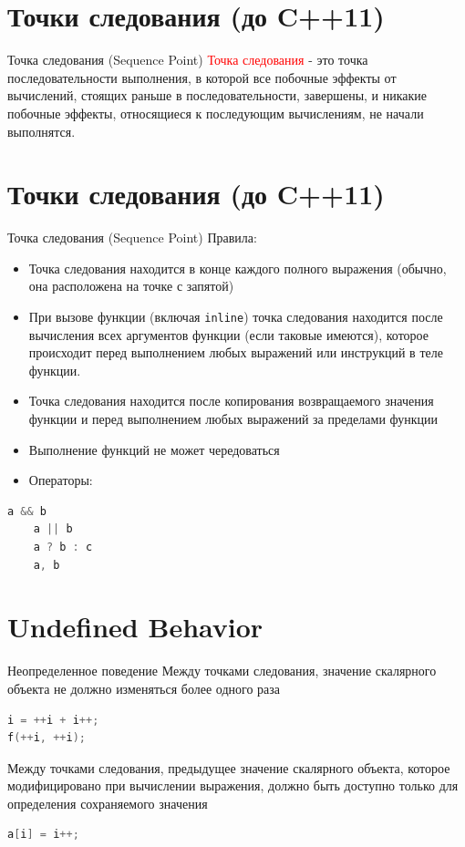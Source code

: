 \documentclass[10pt]{beamer}
\begin{document}
\section{Точки следования (до C++11)}
\begin{frame}{Точка следования (Sequence Point)}
\textcolor{red}{Точка следования} - это точка последовательности выполнения, в которой все побочные эффекты от вычислений, стоящих раньше в последовательности, завершены, и никакие побочные эффекты, относящиеся к последующим вычислениям, не начали выполнятся.
\end{frame}

\section{Точки следования (до C++11)}
\begin{frame}[fragile]{Точка следования (Sequence Point)}
Правила:
\begin{itemize}
\item{Точка следования находится в конце каждого полного выражения (обычно, она расположена на точке с запятой)}
\item{При вызове функции (включая \texttt{inline}) точка следования находится после вычисления всех аргументов функции (если таковые имеются), которое происходит перед выполнением любых выражений или инструкций в теле функции.}
\item{Точка следования находится после копирования возвращаемого значения функции и перед выполнением любых выражений за пределами функции}
\item{Выполнение функций не может чередоваться}
\item{Операторы:}
\end{itemize}
\begin{lstlisting}[language=C++]
    a && b
    a || b
    a ? b : c
    a, b
\end{lstlisting}
\end{frame}

\section{Undefined Behavior}
\begin{frame}[fragile]{Неопределенное поведение}
Между точками следования, значение скалярного объекта не должно изменяться более одного раза
\begin{lstlisting}[language=C++]
i = ++i + i++;
f(++i, ++i);
\end{lstlisting}
\pause
Между точками следования, предыдущее значение скалярного объекта, которое модифицировано при вычислении выражения, должно быть доступно только для определения сохраняемого значения
\begin{lstlisting}[language=C++]
 a[i] = i++;
\end{lstlisting}
\end{frame}
\end{document}
